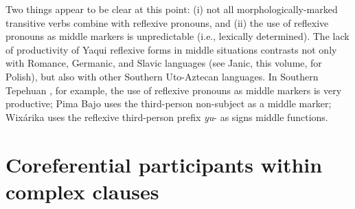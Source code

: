 \documentclass[output=paper]{langscibook}
\begin{document}
\ea%
    \label{ex:guerrero:31}





\z
\z



Two things appear to be clear at this point: (i) not all morphologically-marked transitive verbs combine with reflexive pronouns, and (ii) the use of reflexive pronouns as middle markers is unpredictable (i.e., lexically determined). The lack of productivity of Yaqui reflexive forms in middle situations contrasts not only with Romance, Germanic, and Slavic languages (see Janic, this volume, for Polish), but also with other Southern Uto-Aztecan languages. In Southern Tepehuan \citep{Garcia2005}, for example, the use of reflexive pronouns as middle markers is very productive; Pima Bajo \citep{Estrada2005} uses the third-person non-subject as a middle marker; Wixárika \citep{Ramos2017} uses the reflexive third-person prefix \textit{yu}{}- as signs middle functions.



\section{Coreferential participants within complex clauses}\label{sec:guerrero:5}
\end{document}
